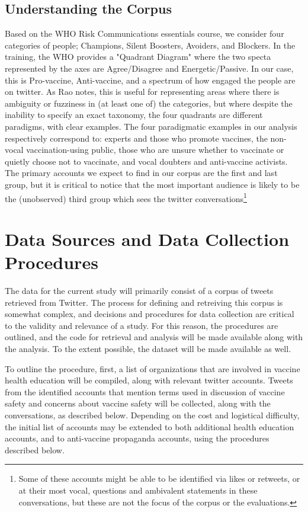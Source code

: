 \documentclass{article}
\begin{document}
\subsection{Understanding the Corpus}

Based on the WHO Risk Communications essentials course, we consider four categories of people; Champions, Silent Boosters, Avoiders, and Blockers. In the training, the WHO provides a "Quadrant Diagram" \cite{Rao2009b} where the two specta represented by the axes are Agree/Disagree and Energetic/Passive. In our case, this is Pro-vaccine, Anti-vaccine, and a spectrum of how engaged the people are on twitter. As Rao notes, this is useful for representing areas where there is ambiguity or fuzziness in (at least one of) the categories, but where despite the inability to specify an exact taxonomy, the four quadrants are different paradigms, with clear examples. The four paradigmatic examples in our analysis respectively correspond to: experts and those who promote vaccines, the non-vocal vaccination-using public, those who are unsure whether to vaccinate or quietly choose not to vaccinate, and vocal doubters and anti-vaccine activists. The primary accounts we expect to find in our corpus are the first and last group, but it is critical to notice that the most important audience is likely to be the (unobserved) third group which sees the twitter conversations\footnote{Some of these accounts might be able to be identified via likes or retweets, or at their most vocal, questions and ambivalent statements in these conversations, but these are not the focus of the corpus or the evaluations.}



\section{Data Sources and Data Collection Procedures}

The data for the current study will primarily consist of a corpus of tweets retrieved from Twitter. The process for defining and retreiving this corpus is somewhat complex, and decisions and procedures for data collection are critical to the validity and relevance of a study. For this reason, the procedures are outlined, and the code for retrieval and analysis will be made available along with the analysis. To the extent possible, the dataset will be made available as well.

To outline the procedure, first, a list of organizations that are involved in vaccine health education will be compiled, along with relevant twitter accounts.  Tweets from the identified accounts that mention terms used in discussion of vaccine safety and concerns about vaccine safety will be collected, along with the conversations, as described below. Depending on the cost and logistical difficulty, the initial list of accounts may be extended to both additional health education accounts, and to anti-vaccine propaganda accounts, using the procedures described below.
\end{document}
